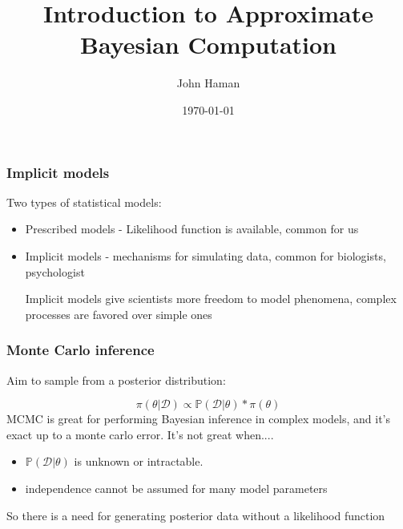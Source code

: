 \documentclass{beamer}
\title[ABC]{Introduction to Approximate Bayesian Computation} %
\author{John Haman} %
\institute[BGSU] %
{
  Bowling Green State University \\ %
  \medskip
  \textit{jthaman@bgsu.edu} %
}
\date{\today} %
\begin{document}
\begin{frame}
  \titlepage %
\end{frame}


\begin{frame}
  \frametitle{Implicit models}

Two types of statistical models:

\begin{itemize}
\item Prescribed models - Likelihood function is available, common for us
\item Implicit models - mechanisms for simulating data, common for biologists, psychologist

\pause
\vskip 0.5in

Implicit models give scientists more freedom to model phenomena, complex processes are favored over simple ones
\end{itemize}

\end{frame}

\begin{frame}
  \frametitle{Monte Carlo inference}

Aim to sample from a posterior distribution:

$$  \pi ( \theta | \mathcal{D} ) \propto \mathbb{P}( \mathcal{D} | \theta) * \pi ( \theta) $$ 
\pause
MCMC is great for performing Bayesian inference in complex models, and it's exact up to a monte carlo error. It's not great when.... 

\pause

\begin{itemize}
\item $\mathbb{P} (\mathcal{D} | \theta) $ is unknown or intractable. 
\pause
\item independence cannot be assumed for many model parameters
\end{itemize}

So there is a need for generating posterior data without a likelihood function
\end{frame}
\end{document}
